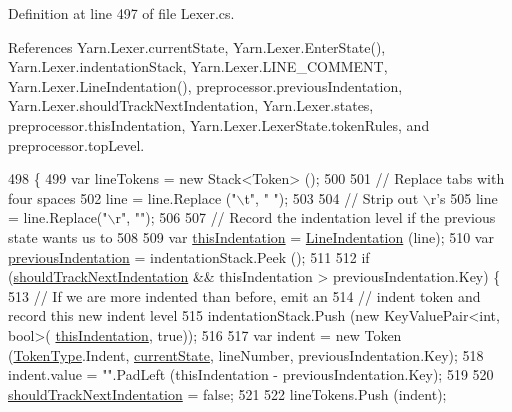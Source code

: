 Definition at line 497 of file Lexer.\-cs.



References Yarn.\-Lexer.\-current\-State, Yarn.\-Lexer.\-Enter\-State(), Yarn.\-Lexer.\-indentation\-Stack, Yarn.\-Lexer.\-L\-I\-N\-E\-\_\-\-C\-O\-M\-M\-E\-N\-T, Yarn.\-Lexer.\-Line\-Indentation(), preprocessor.\-previous\-Indentation, Yarn.\-Lexer.\-should\-Track\-Next\-Indentation, Yarn.\-Lexer.\-states, preprocessor.\-this\-Indentation, Yarn.\-Lexer.\-Lexer\-State.\-token\-Rules, and preprocessor.\-top\-Level.


\begin{DoxyCode}
498         \{
499             var lineTokens = \textcolor{keyword}{new} Stack<Token> ();
500 
501             \textcolor{comment}{// Replace tabs with four spaces}
502             line = line.Replace (\textcolor{stringliteral}{"\(\backslash\)t"}, \textcolor{stringliteral}{"    "});
503 
504             \textcolor{comment}{// Strip out \(\backslash\)r's}
505             line = line.Replace(\textcolor{stringliteral}{"\(\backslash\)r"}, \textcolor{stringliteral}{""});
506 
507             \textcolor{comment}{// Record the indentation level if the previous state wants us to}
508 
509             var \hyperlink{a00351_a0e59365a4aa5811f6495b92a51e23573}{thisIndentation} = \hyperlink{a00129_a4079b10b099e5d85f5482f9e7eac4179}{LineIndentation} (line);
510             var \hyperlink{a00351_ade44b858578c3eab7b6f90030a0e3ea1}{previousIndentation} = indentationStack.Peek ();
511 
512             \textcolor{keywordflow}{if} (\hyperlink{a00129_ac670aac2245cbd4694dfbd5b69313218}{shouldTrackNextIndentation} && thisIndentation > 
      previousIndentation.Key) \{
513                 \textcolor{comment}{// If we are more indented than before, emit an}
514                 \textcolor{comment}{// indent token and record this new indent level}
515                 indentationStack.Push (\textcolor{keyword}{new} KeyValuePair<int, bool>(
      \hyperlink{a00351_a0e59365a4aa5811f6495b92a51e23573}{thisIndentation}, \textcolor{keyword}{true}));
516 
517                 var indent = \textcolor{keyword}{new} Token (\hyperlink{a00053_a301aa7c866593a5b625a8fc158bbeace}{TokenType}.Indent, \hyperlink{a00129_ac90b7dce8103425a148f9e8588f14137}{currentState}, lineNumber, 
      previousIndentation.Key);
518                 indent.value = \textcolor{stringliteral}{""}.PadLeft (thisIndentation - previousIndentation.Key);
519 
520                 \hyperlink{a00129_ac670aac2245cbd4694dfbd5b69313218}{shouldTrackNextIndentation} = \textcolor{keyword}{false};
521 
522                 lineTokens.Push (indent);

\end{DoxyCode}
